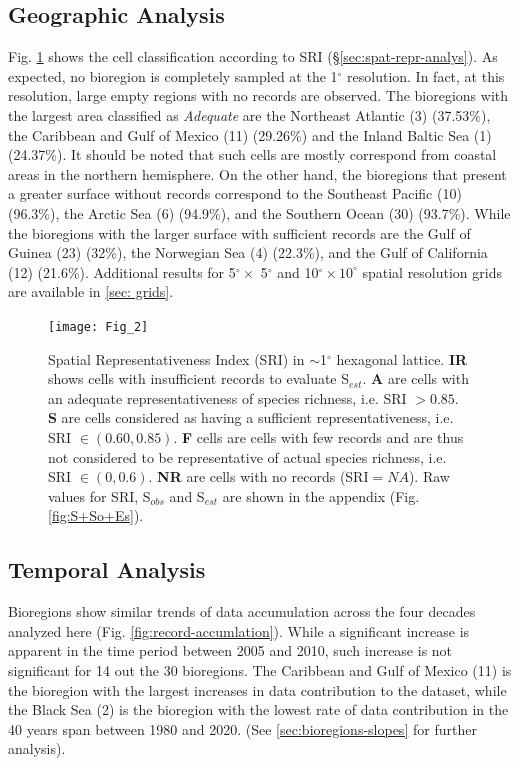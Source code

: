 \documentclass[12pt,authoryear]{elsarticle}
\begin{document}
\subsection{Geographic Analysis}

Fig. \ref{fig:cell_map} shows the cell classification according to SRI (\S \ref{sec:spat-repr-analys}). As expected, no bioregion is completely sampled at the 1$^\circ$ resolution. In fact, at this resolution, large empty regions with no records are observed. The bioregions with the largest area classified as \textit{Adequate} are the Northeast Atlantic (3) (37.53\%), the Caribbean and Gulf of Mexico (11) (29.26\%) and the Inland Baltic Sea (1) (24.37\%). It should be noted that such cells are mostly correspond from coastal areas in the northern hemisphere. On the other hand, the bioregions that present a greater surface without records correspond to the Southeast Pacific (10) (96.3\%), the Arctic Sea (6) (94.9\%), and the Southern Ocean (30) (93.7\%). While the bioregions with the larger surface with sufficient records are the Gulf of Guinea (23) (32\%), the Norwegian Sea (4) (22.3\%), and the Gulf of California (12) (21.6\%). Additional results for 5$^\circ \times$ 5$^\circ$ and  10$^\circ\times 10^\circ$ spatial resolution grids are available in \ref{sec: grids}.


\begin{figure}
  \centering
  \texttt{[image: Fig\_2]}
   \caption[]{Spatial Representativeness Index (SRI) in $\sim$1$^\circ$ hexagonal lattice. \textbf{IR} shows cells with insufficient records to evaluate S$_{est}$. \textbf{A} are cells with an adequate representativeness of species richness, i.e. SRI $> 0.85$. \textbf{S} are cells considered as having a sufficient representativeness, i.e. SRI $\in (0.60,0.85)$. \textbf{F} cells are cells with  few records and are thus not considered to be representative of actual species richness, i.e. SRI $\in (0,0.6)$. \textbf{NR} are cells with no records (SRI$= NA$). Raw values for SRI, S$_{obs}$ and S$_{est}$ are shown in the appendix (Fig. \ref{fig:S+So+Es}).
     \label{fig:cell_map}}
   
\end{figure}

\subsection{Temporal Analysis}
\label{sec:temporal-analysis}
Bioregions show similar trends of data accumulation across the four decades analyzed here (Fig. \ref{fig:record-accumlation}). While a significant increase is apparent in the time period between 2005 and 2010, such increase is not significant for 14 out the 30 bioregions. The Caribbean and Gulf of Mexico (11) is the bioregion with the largest increases in data contribution to the dataset, while the Black Sea (2) is the bioregion with the lowest rate of data contribution in the 40 years span between 1980 and 2020. (See \ref{sec:bioregions-slopes} for further analysis).
\end{document}
